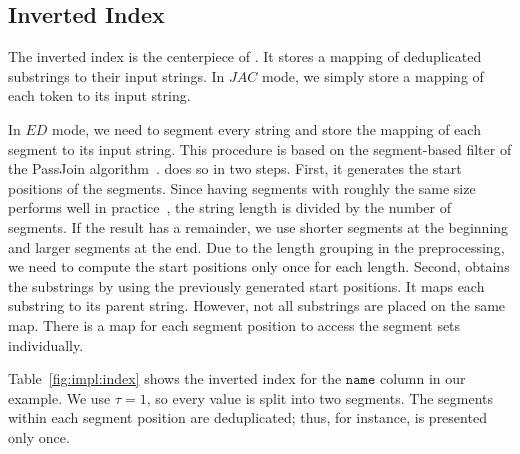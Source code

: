 
\subsection{Inverted Index}
The inverted index is the centerpiece of \sawfish.
It stores a mapping of deduplicated substrings to their input strings.
In $JAC$ mode, we simply store a mapping of each token to its input string.

In $ED$ mode, we need to segment every string and store the mapping of each segment to its input string.
This procedure is based on the segment-based filter of the PassJoin algorithm~\cite{PassJoin}.
\sawfish does so in two steps.
First, it generates the start positions of the segments.
Since having segments with roughly the same size performs well in practice~\cite{PassJoin}, the string length is divided by the number of segments.
If the result has a remainder, we use shorter segments at the beginning and larger segments at the end.
Due to the length grouping in the preprocessing, we need to compute the start positions only once for each length.
Second, \sawfish obtains the substrings by using the previously generated start positions.
It maps each substring to its parent string.
However, not all substrings are placed on the same map.
There is a map for each segment position to access the segment sets individually.

Table~\ref{fig:impl:index} shows the inverted index for the $\mathtt{name}$ column in our example.
We use $\tau = 1$, so every value is split into two segments.
The segments within each segment position are deduplicated; thus, for instance,  is presented only once.


